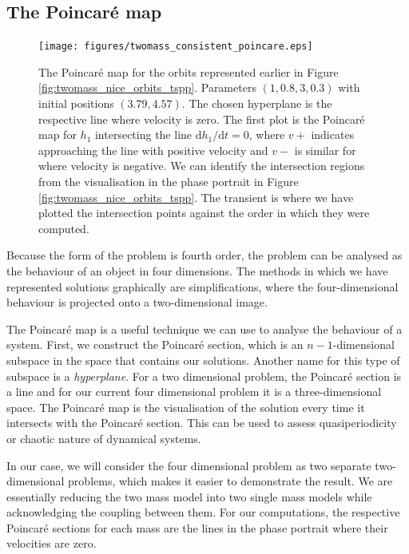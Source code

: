\subsection{The Poincar\'e map}

\begin{figure}[h!]
    \centering
    \texttt{[image: figures/twomass\_consistent\_poincare.eps]}
    \caption{
        The Poincar\'e map for the orbits represented earlier in Figure \ref{fig:twomass_nice_orbits_tspp}.
        Parameters \((1, 0.8, 3, 0.3)\) with initial positions \((3.79,4.57)\).
        The chosen hyperplane is the respective line where velocity is zero.
        The first plot is the Poincar\'e map for $h_1$ intersecting the line $\mathrm{d}h_1/\mathrm{d}t = 0$,
        where $v+$ indicates approaching the line with positive velocity and $v-$ is similar for where velocity is negative.
        We can identify the intersection regions from the visualisation in the phase portrait in Figure \ref{fig:twomass_nice_orbits_tspp}.
        The transient is where we have plotted the intersection points against the order in which they were computed.
    }
    \label{fig:twomass_poincare_nice}
\end{figure}

Because the form of the problem is fourth order,
the problem can be analysed as the behaviour of an object in four dimensions.
The methods in which we have represented solutions graphically are simplifications,
where the four-dimensional behaviour is projected onto a two-dimensional image.

The Poincar\'e map is a useful technique we can use to analyse the behaviour of a system.
First, we construct the Poincar\'e section,
which is an $n-1$-dimensional subspace in the space that contains our solutions.
Another name for this type of subspace is a \textit{hyperplane}.
For a two dimensional problem, the Poincar\'e section is a line and for our current four dimensional problem it is a three-dimensional space.
The Poincar\'e map is the visualisation of the solution every time it intersects with the Poincar\'e section.
This can be used to assess quasiperiodicity or chaotic nature of dynamical systems.

In our case, we will consider the four dimensional problem as two separate two-dimensional problems,
which makes it easier to demonstrate the result.
We are essentially reducing the two mass model into two single mass models while acknowledging the coupling between them.
For our computations, the respective Poincar\'e sections for each mass are the lines in the phase portrait where their velocities are zero.

